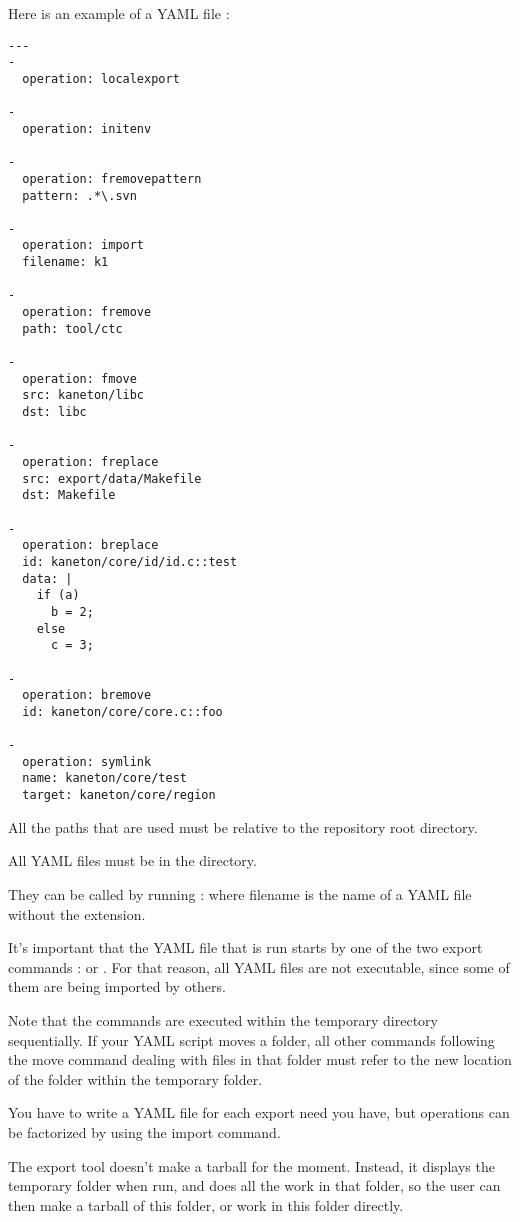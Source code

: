 Here is an example of a YAML file :

\begin{verbatim}
---
-
  operation: localexport

-
  operation: initenv

-
  operation: fremovepattern
  pattern: .*\.svn

-
  operation: import
  filename: k1

-
  operation: fremove
  path: tool/ctc

-
  operation: fmove
  src: kaneton/libc
  dst: libc

-
  operation: freplace
  src: export/data/Makefile
  dst: Makefile

-
  operation: breplace
  id: kaneton/core/id/id.c::test
  data: |
    if (a)
      b = 2;
    else
      c = 3;

-
  operation: bremove
  id: kaneton/core/core.c::foo

-
  operation: symlink
  name: kaneton/core/test
  target: kaneton/core/region

\end{verbatim}

All the paths that are used must be relative to the repository root directory.


All YAML files must be in the  directory.

They can be called by running :  where filename is the name of a YAML file without the extension.

It's important that the YAML file that is run starts by one of the two export commands :  or . For that reason, all YAML files are not executable, since some of them are being imported by others.

Note that the commands are executed within the temporary directory sequentially. If your YAML script moves a folder, all other commands following the move command dealing with files in that folder must refer to the new location of the folder within the temporary folder.

You have to write a YAML file for each export need you have, but operations can be factorized by using the import command.

The export tool doesn't make a tarball for the moment. Instead, it displays the temporary folder when run, and does all the work in that folder, so the user can then make a tarball of this folder, or work in this folder directly.

